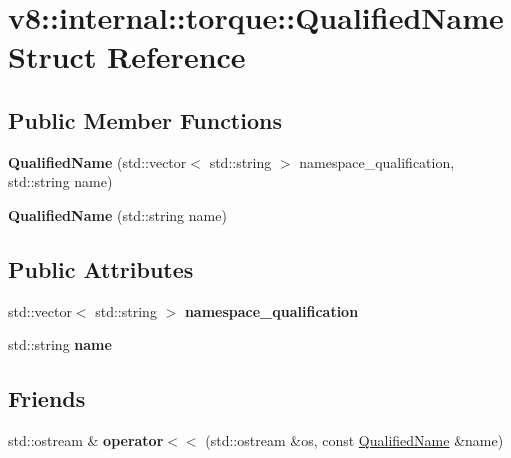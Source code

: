 \hypertarget{structv8_1_1internal_1_1torque_1_1QualifiedName}{}\section{v8\+:\+:internal\+:\+:torque\+:\+:Qualified\+Name Struct Reference}
\label{structv8_1_1internal_1_1torque_1_1QualifiedName}
\subsection*{Public Member Functions}
\begin{DoxyCompactItemize}
\item 
\mbox{\label{structv8_1_1internal_1_1torque_1_1QualifiedName_a051a0ab1b6cee2c38f4e3ba5fbbba91a}} 
{\bfseries Qualified\+Name} (std\+::vector$<$ std\+::string $>$ namespace\+\_\+qualification, std\+::string name)
\item 
\mbox{\label{structv8_1_1internal_1_1torque_1_1QualifiedName_ad46f6aaa2c335e453e2d12c200ec5a0d}} 
{\bfseries Qualified\+Name} (std\+::string name)
\end{DoxyCompactItemize}
\subsection*{Public Attributes}
\begin{DoxyCompactItemize}
\item 
\mbox{\label{structv8_1_1internal_1_1torque_1_1QualifiedName_a718596d7853bc7c1bb5a3ea54cee14a5}} 
std\+::vector$<$ std\+::string $>$ {\bfseries namespace\+\_\+qualification}
\item 
\mbox{\label{structv8_1_1internal_1_1torque_1_1QualifiedName_a1de8f5c500641a2348ba0c65a2ccd56f}} 
std\+::string {\bfseries name}
\end{DoxyCompactItemize}
\subsection*{Friends}
\begin{DoxyCompactItemize}
\item 
\mbox{\label{structv8_1_1internal_1_1torque_1_1QualifiedName_a840ca290a1a5fe3d69269be56011fdc7}} 
std\+::ostream \& {\bfseries operator$<$$<$} (std\+::ostream \&os, const \mbox{\hyperlink{structv8_1_1internal_1_1torque_1_1QualifiedName}{Qualified\+Name}} \&name)
\end{DoxyCompactItemize}


